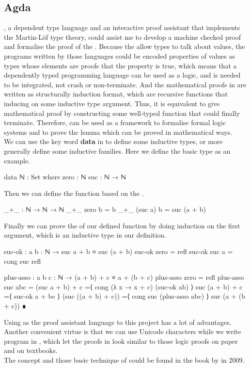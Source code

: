 \subsection{Agda}
\Agda, a dependent type language and an interactive proof assistant that
implements the Martin-Löf type theory\cite{van_oosten_homotopy_2014}, could assist me to develop a machine checked proof and formalise the proof of the . 
Because the  allow types to talk about values, the programs written by those languages could be encoded properties of values as types whose elements are proofs that the
property is true, which means that a dependently typed programming language can be used as a logic, and is needed to be integrated, not crash or non-terminate.
And the mathematical proofs in \Agda are written as structurally induction format, which are recursive functions that inducing on some inductive type argument.
Thus, it is equivalent to give mathematical proof by constructing some well-typed function that could finally terminate.
Therefore, \Agda can be used as a framework to formalise formal logic systems and to prove the lemma which can be proved in mathematical ways.\\
We can use the key word \textbf{data} in \Agda to define some inductive types, or more generally define some inductive families.
Here we define the basic type  as an example.
\begin{code}
data ℕ : Set where
  zero : ℕ
  suc  : ℕ → ℕ
\end{code}
Then we can define the function  based on the .
\begin{code}
_+_ : ℕ → ℕ → ℕ
_+_ zero b = b
_+_ (suc a) b = suc (a + b)
\end{code}
Finally we can prove the  of our defined function by doing induction on the first argument, which is an inductive type in our definition.
\begin{code}[fontsize=\footnotesize]
suc-ok :  {a b : ℕ} → suc a + b ≡ suc (a + b)
suc-ok {zero} = refl
suc-ok {suc a} = cong suc refl

plus-asso : {a b c : ℕ} → (a + b) + c ≡ a + (b + c)
plus-asso {zero} = refl
plus-asso {suc a}{b}{c} = (suc a + b) + c
                        =⟨ cong (λ x → x + c) (suc-ok {a}{b}) ⟩
                        suc (a + b) + c
                        =⟨ suc-ok {a + b}{c} ⟩
                        (suc ((a + b) + c))
                        =⟨ cong suc (plus-asso {a}{b}{c}) ⟩
                        suc (a + (b + c))
                        ∎
\end{code}
Using \Agda as the proof assistant language to this project has a lot of advantages.
Another convenient virtue is that we can use Unicode characters while we write program in \Agda, which let the proofs in \Agda look similar to those logic proofs on paper and on textbooks.\\
The concept and those basic technique of \Agda could be found in the book  by  in 2009\cite{norell_dependently_2009}.

